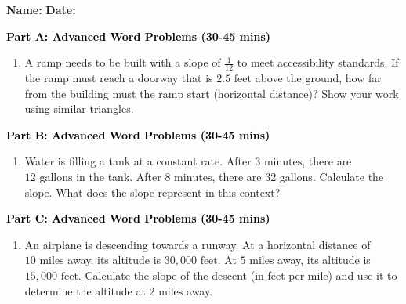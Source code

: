 \documentclass[12pt, letterpaper, fleqn]{article}
\begin{document}
\textbf{Name:} \underline{\hspace{5cm}}
\hfill
\textbf{Date:} \underline{\hspace{3cm}}\\


\begin{tcolorbox}[colback=customteal!20]
\large\textcolor{black}{\textbf{Part A: Advanced Word Problems (30-45 mins)}}
\end{tcolorbox}

\vspace{3mm}

\begin{enumerate}[itemsep=5.5cm, leftmargin=0.6cm]
\item A ramp needs to be built with a slope of $\frac{1}{12}$ to meet accessibility standards. If the ramp must reach a doorway that is $2.5\text{ feet}$ above the ground, how far from the building must the ramp start (horizontal distance)? Show your work using similar triangles.
\end{enumerate}

\newpage

\begin{tcolorbox}[colback=customteal!20]
\large\textcolor{black}{\textbf{Part B: Advanced Word Problems (30-45 mins)}}
\end{tcolorbox}

\vspace{3mm}

\begin{enumerate}[itemsep=5.5cm, leftmargin=0.6cm, resume]
\item Water is filling a tank at a constant rate. After $3\text{ minutes}$, there are $12\text{ gallons}$ in the tank. After $8\text{ minutes}$, there are $32\text{ gallons}$. Calculate the slope. What does the slope represent in this context?
\end{enumerate}

\newpage

\begin{tcolorbox}[colback=customteal!20]
\large\textcolor{black}{\textbf{Part C: Advanced Word Problems (30-45 mins)}}
\end{tcolorbox}

\vspace{3mm}

\begin{enumerate}[itemsep=5.5cm, leftmargin=0.6cm, resume]
\item An airplane is descending towards a runway. At a horizontal distance of $10\text{ miles}$ away, its altitude is $30,000\text{ feet}$. At $5\text{ miles}$ away, its altitude is $15,000\text{ feet}$. Calculate the slope of the descent (in feet per mile) and use it to determine the altitude at $2\text{ miles}$ away.
\end{enumerate}
\end{document}
